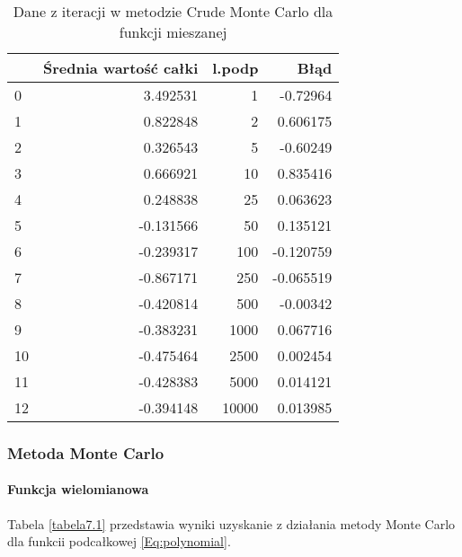 \documentclass[12pt,twoside]{article}
\begin{document}
\begin{table}[H]
\centering 
\caption{Dane z iteracji w metodzie Crude Monte Carlo dla funkcji mieszanej}
\label{tabela6.3}
\begin{tabular}{lrrr}
\toprule
{} &  Średnia wartość całki &  l.podp &      Błąd \\
\midrule
0  &               3.492531 &       1 & -0.72964 \\
1  &               0.822848 &       2 &  0.606175 \\
2  &               0.326543 &       5 & -0.60249 \\
3  &               0.666921 &      10 &  0.835416 \\
4  &               0.248838 &      25 &  0.063623 \\
5  &              -0.131566 &      50 &  0.135121 \\
6  &              -0.239317 &     100 & -0.120759 \\
7  &              -0.867171 &     250 & -0.065519 \\
8  &              -0.420814 &     500 & -0.00342 \\
9  &              -0.383231 &    1000 &  0.067716 \\
10 &              -0.475464 &    2500 &  0.002454 \\
11 &              -0.428383 &    5000 &  0.014121 \\
12 &              -0.394148 &   10000 &  0.013985 \\
\bottomrule
\end{tabular}
\end{table}


\subsubsection{Metoda Monte Carlo}

\paragraph{Funkcja wielomianowa}

Tabela \eqref{tabela7.1} przedstawia wyniki uzyskanie z działania metody Monte Carlo dla funkcii podcałkowej \eqref{Eq:polynomial}.
\end{document}
